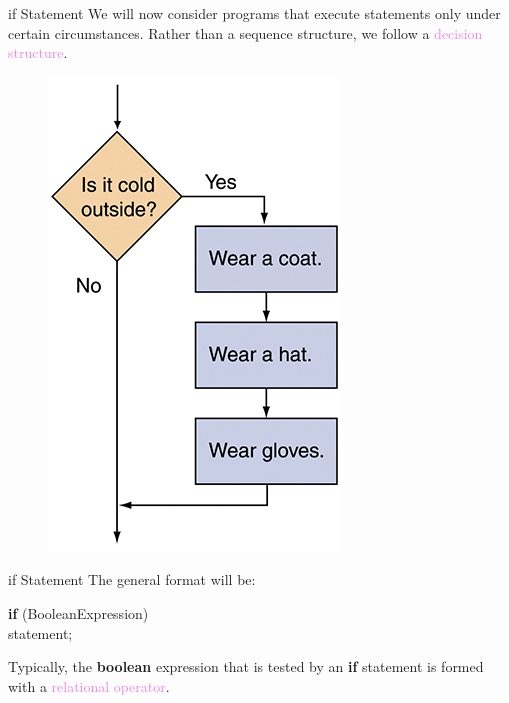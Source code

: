 \documentclass[11pt]{beamer}
\newcommand{\violet}[1]{\textcolor{violet}{#1}}
\begin{document}
\begin{frame}{if Statement}
    We will now consider programs that execute statements only under certain circumstances. Rather than a sequence structure, we follow a \violet{decision structure}.    
        \noindent 
        \begin{figure}[H]
        \centering
        \includegraphics[scale=0.3]{Images/chapter03_decisionCode.png}
        \end{figure}
\end{frame}

\begin{frame}{if Statement}
    The general format will be:
    \vspace{2em}
    \begin{center}
        \noindent \textbf{if} (BooleanExpression) \\ 
        \hspace{1em} statement; 
    \end{center}
    Typically, the \textbf{boolean} expression that is tested by an \textbf{if} statement is formed with a \violet{relational operator}.
\end{frame}
\end{document}
